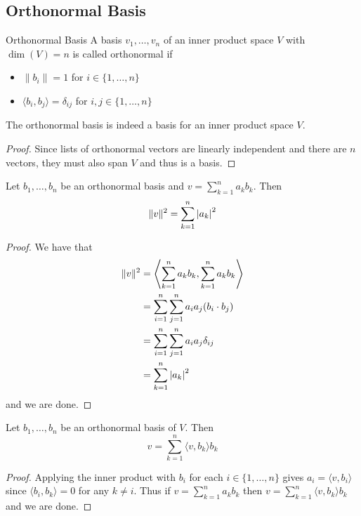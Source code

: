 \documentclass[a4paper]{article}
\begin{document}
\subsection{Orthonormal Basis}
\begin{defn}{Orthonormal Basis}{} A basis $v_1,\dots,v_n$ of an inner product space $V$ with $\dim(V)=n$ is called orthonormal if 
\begin{itemize}
\item $\|b_i\|=1$ for $i\in\{1,\dots,n\}$
\item $\langle b_i,b_j\rangle=\delta_{ij}$ for $i,j\in\{1,\dots,n\}$
\end{itemize}
\end{defn}

\begin{prp}{}{} The orthonormal basis is indeed a basis for an inner product space $V$. \tcbline
\begin{proof}
Since lists of orthonormal vectors are linearly independent and there are $n$ vectors, they must also span $V$ and thus is a basis. 
\end{proof}
\end{prp}

\begin{thm}{}{} Let $b_1,\dots,b_n$ be an orthonormal basis and $v=\sum_{k=1}^na_kb_k$. Then $$\|v\|^2=\sum_{k=1}^n\abs{a_k}^2$$ \tcbline
\begin{proof}
We have that 
\begin{align*}
\|v\|^2&=\left\langle\sum_{k=1}^na_kb_k, \sum_{k=1}^na_kb_k\right\rangle \\
&=\sum_{i=1}^n\sum_{j=1}^na_ia_j(b_i\cdot b_j)\\
&=\sum_{i=1}^n\sum_{j=1}^na_ia_j\delta_{ij}\\
&=\sum_{k=1}^n\abs{a_k}^2
\end{align*}
and we are done. 
\end{proof}
\end{thm}

\begin{prp}{}{} Let $b_1,\dots,b_n$ be an orthonormal basis of $V$. Then $$v=\sum_{k=1}^n\langle v,b_k\rangle b_k$$ \tcbline
\begin{proof}
Applying the inner product with $b_i$ for each $i\in\{1,\dots,n\}$ gives $a_i=\langle v,b_i\rangle$ since $\langle b_i,b_k\rangle=0$ for any $k\neq i$. Thus if $v=\sum_{k=1}^na_kb_k$ then $v=\sum_{k=1}^n\langle v,b_k\rangle b_k$ and we are done. 
\end{proof}
\end{prp}
\end{document}
